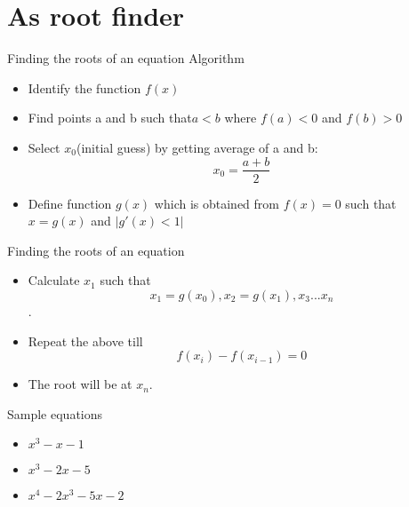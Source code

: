 \documentclass[14pt]{beamer}
\begin{document}
\section{As root finder}
\begin{frame}{Finding the roots of an equation}
    Algorithm
    \begin{itemize}
        \item<1->Identify the function $f(x)$
        \item<2->Find points a and b such that$ a < b$ where $f(a)<0$ and $f(b)>0$
        \item<3->Select $x_0$(initial guess) by getting average of a and b: $$x_0 = \frac{a + b}{2}$$
        \item<4->Define function $g(x)$ which is obtained from $f(x) = 0$ such that $x = g(x)$ and
        $\left\lvert g\prime(x)  < 1\right\rvert$
    \end{itemize}

\end{frame}

\begin{frame}{Finding the roots of an equation}
    \begin{itemize}
        \item<1-> Calculate $x_1$ such that $$x_1 = g(x_0) , x_2 = g(x_1), x_3 ... x_n$$.
        \item<2-> Repeat the above till$$f(x_i) - f(x_{i-1}) = 0$$
        \item<3-> The root will be at $x_n$.
    \end{itemize}
\end{frame}

\begin{frame}{Sample equations}
    \begin{itemize}
        \item $x^3 - x - 1$
        \item  $x^3-2x-5$
        \item $x^4-2x^3-5x-2$
    \end{itemize}
\end{frame}
\end{document}
